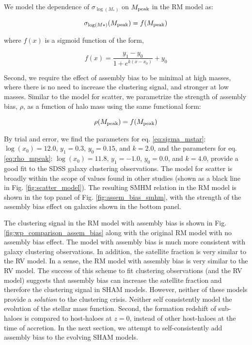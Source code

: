 \documentclass[a4paper,fleqn,usenatbib]{mnras}
\begin{document}
We model the dependence of $\sigma_{\log(M_*)}$ on $M_{\rm peak}$ in the RM model as:
%
\begin{linenomath}
\begin{equation}
\label{eq:sigma_mstar}
\sigma_{\log(M*)}(M_{\rm peak}) = f(M_{\rm peak})
\end{equation}
\end{linenomath}
%
where $f(x)$ is a sigmoid function of the form,
%
\begin{linenomath}
\begin{equation}
f(x) = \frac{y_1 - y_0}{1+ e^{k(x-x_0)}} + y_0
\end{equation}
\end{linenomath}
%
Second, we require the effect of assembly bias to be minimal at high masses, where there is no need to increase the clustering signal, and stronger at low masses.  Similar to the model for scatter, we parametrize the strength of assembly bias, $\rho$, as a function of halo mass using the same functional form:
%
\begin{linenomath}
\begin{equation}
\label{eq:rho_mpeak}
\rho(M_{\rm peak}) = f(M_{\rm peak})
\end{equation}
\end{linenomath}
%
By trial and error, we find the parameters for eq. \ref{eq:sigma_mstar}: $\log(x_{0})=12.0$, $y_1=0.3$, $y_0=0.15$, and $k=2.0$, and the parameters for eq. \ref{eq:rho_mpeak}: $\log(x_{0})=11.8$, $y_1=-1.0$, $y_0=0.0$, and $k=4.0$, provide a good fit to the SDSS galaxy clustering observations.  The model for scatter is broadly within the scope of values found in other studies (shown as a black line in Fig. \ref{fig:scatter_model}).  The resulting SMHM relation in the RM model is shown in the top panel of Fig. \ref{fig:assem_bias_smhm}, with the strength of the assembly bias effect on galaxies shown in the bottom panel.  

The clustering signal in the RM model with assembly bias is shown in Fig. \ref{fig:wp_comparison_assem_bias} along with the original RM model with no assembly bias effect.  The model with assembly bias is much more consistent with galaxy clustering observations.  In addition, the satellite fraction is very similar to the RV model.  In a sense, the RM model with assembly bias is very similar to the RV model.  The success of this scheme to fit clustering observations (and the RV model) suggests that assembly bias can increase the satellite fraction and therefore the clustering signal in SHAM models.  However, neither of these models provide a {\em solution} to the clustering crisis.  Neither self consistently model the evolution of the stellar mass function.  Second, the formation redshift of sub-haloes is compared to host-haloes at $z=0$, instead of other host-haloes at the time of accretion.   In the next section, we attempt to self-consistently add assembly bias to the evolving SHAM models.    
\end{document}
